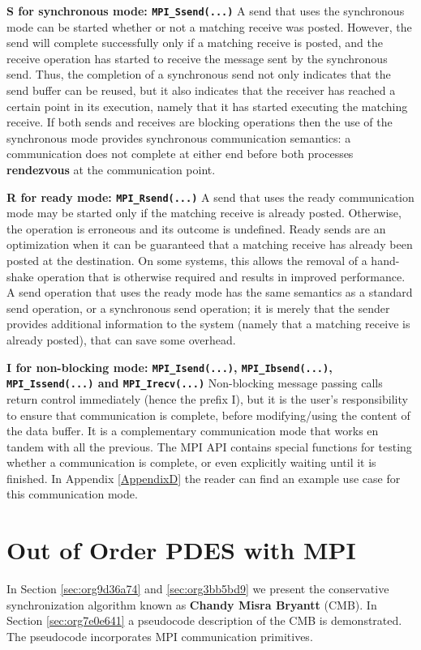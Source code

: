 \documentclass[11pt]{article}
\begin{document}
\textbf{S for synchronous mode: \texttt{MPI\_Ssend(...)}}
A send that uses the synchronous mode can be started whether or not a matching receive was posted. 
However, the send will complete successfully only if a matching receive is posted, and the receive operation has started to receive the message sent by the synchronous send.
Thus, the completion of a synchronous send not only indicates that the send buffer can be reused, 
but it also indicates that the receiver has reached a certain point in its execution, 
namely that it has started executing the matching receive. 
If both sends and receives are blocking operations then the use of the synchronous mode provides synchronous communication semantics: 
a communication does not complete at either end before both processes \textbf{rendezvous} at the communication point.

\textbf{R for ready mode: \texttt{MPI\_Rsend(...)}}
A send that uses the ready communication mode may be started only if the matching receive is already posted. 
Otherwise, the operation is erroneous and its outcome is undefined.
Ready sends are an optimization when it can be guaranteed that a matching receive has already been posted at the destination.
On some systems, this allows the removal of a hand-shake operation that is otherwise required and results in improved performance. 
A send operation that uses the ready mode has the same semantics as a standard send operation, or a synchronous send operation; 
it is merely that the sender provides additional information to the system (namely that a matching receive is already posted), that can save some overhead. 

\textbf{I for non-blocking mode: \texttt{MPI\_Isend(...)}, \texttt{MPI\_Ibsend(...)}, \texttt{MPI\_Issend(...)} and \texttt{MPI\_Irecv(...)}}
Non-blocking message passing calls return control immediately (hence the prefix I), 
but it is the user's responsibility to ensure that communication is complete, 
before modifying/using the content of the data buffer.
It is a complementary communication mode that works en tandem with all the previous.
The MPI API contains special functions for testing whether a communication is complete, or even explicitly waiting until it is finished.
In Appendix \ref{AppendixD} the reader can find an example use case for this communication mode.


\clearpage

\section{Out of Order PDES with MPI}
\label{sec:orgb236fc3}
In Section \ref{sec:org9d36a74} and \ref{sec:org3bb5bd9} we present the conservative synchronization algorithm known as \textbf{Chandy Misra Bryantt} (CMB).
In Section \ref{sec:org7e0e641} a pseudocode description of the CMB is demonstrated. The pseudocode incorporates MPI communication primitives.
\end{document}
